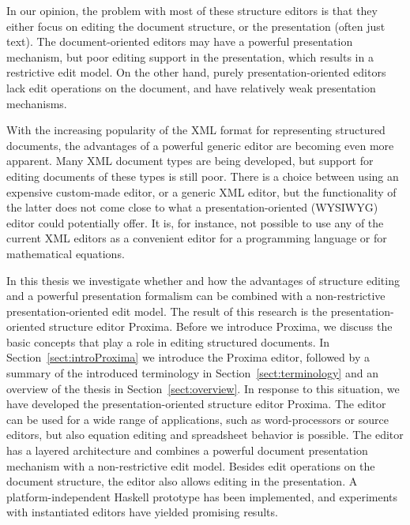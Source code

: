 In our opinion, the problem with most of these structure editors is that they either focus on editing the document structure, or the presentation (often just text).
The document-oriented editors may have a powerful presentation mechanism, but poor editing support in the presentation, which results in a restrictive edit model. On the other hand,  purely presentation-oriented editors lack edit operations on the document, and have relatively weak presentation mechanisms.

With the increasing popularity of the XML format for representing structured documents, the advantages of a powerful generic editor are becoming even more apparent. Many XML document types are being developed, but support for editing documents of these types is still poor. 
There is a choice between using an expensive custom-made editor, or a generic XML editor, but the functionality of the latter does not come close to what a presentation-oriented (WYSIWYG) editor could potentially offer. It is, for instance, not possible to use any of the current XML editors as a convenient editor for a programming language or for mathematical equations.

In this thesis we investigate whether and how the advantages of structure editing and a powerful presentation formalism can be combined with a non-restrictive presentation-oriented edit model. The result of this research is the presentation-oriented structure editor Proxima.
Before we introduce Proxima, we discuss the basic concepts that play a role in editing structured documents. In Section~\ref{sect:introProxima} we introduce the Proxima editor, followed by a summary of the introduced terminology in Section~\ref{sect:terminology} and an overview of the thesis in Section~\ref{sect:overview}.
\bc
In response to this situation, we have developed  the presentation-oriented structure editor Proxima. The editor can be used for a wide range of applications, such as word-processors or source editors, but also equation editing and spreadsheet behavior is possible. The editor has a layered architecture and combines a powerful document presentation mechanism with a non-restrictive edit model. Besides edit operations on the document structure, the editor also allows editing in the presentation.  A platform-independent Haskell prototype has been implemented, and experiments with instantiated editors have yielded promising results.
\ec

